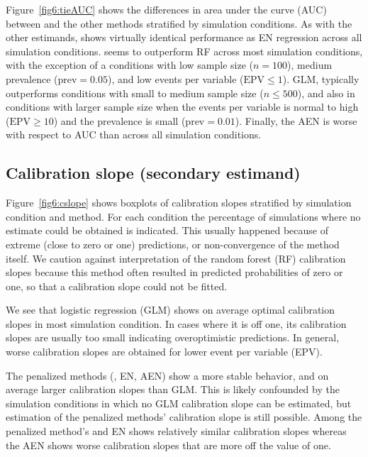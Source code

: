 \begin{subappendices}
Figure~\ref{fig6:tieAUC} shows the differences in area under the curve (AUC)
between \ainet{} and the other methods stratified by simulation conditions. As
with the other estimands, \ainet{} shows virtually identical performance as EN
regression across all simulation conditions. \ainet{} seems to outperform RF
across most simulation conditions, with the exception of a conditions with low
sample size ($n = 100$), medium prevalence ($\mbox{prev} = 0.05$), and low
events per variable ($\mbox{EPV} \leq 1$). GLM, typically outperforms \ainet{}
conditions with small to medium sample size ($n \leq 500$), and also in
conditions with larger sample size when the events per variable is normal to
high ($\mbox{EPV} \geq 10$) and the prevalence is small ($\mbox{prev} = 0.01$).
Finally, the AEN is worse with respect to AUC than \ainet{} across all
simulation conditions.


\subsection{Calibration slope (secondary estimand)}

Figure~\ref{fig6:cslope} shows boxplots of calibration slopes stratified by
simulation condition and method. For each condition the percentage of
simulations where no estimate could be obtained is indicated. This usually
happened because of extreme (close to zero or one) predictions, or
non-convergence of the method itself. We caution against interpretation of the
random forest (RF) calibration slopes because this method often resulted in
predicted probabilities of zero or one, so that a calibration slope could not be
fitted.

We see that logistic regression (GLM) shows on average optimal calibration
slopes in most simulation condition. In cases where it is off one, its
calibration slopes are usually too small indicating overoptimistic predictions.
In general, worse calibration slopes are obtained for lower event per variable
(EPV).

The penalized methods (\ainet{}, EN, AEN) show a more stable behavior, and on
average larger calibration slopes than GLM. This is likely confounded by the
simulation conditions in which no GLM calibration slope can be estimated, but
estimation of the penalized methods' calibration slope is still possible. Among
the penalized method's \ainet{} and EN shows relatively similar calibration
slopes whereas the AEN shows worse calibration slopes that are more off the
value of one.



\end{subappendices}
